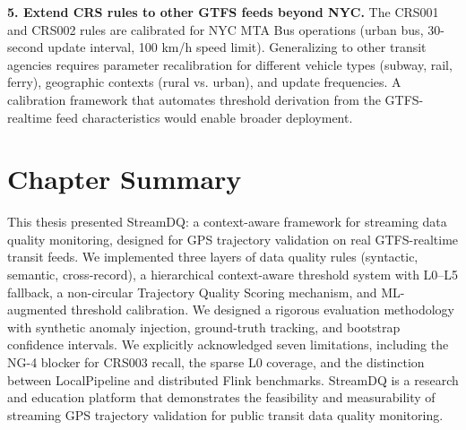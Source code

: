 \textbf{5. Extend CRS rules to other GTFS feeds beyond NYC.} The
CRS001 and CRS002 rules are calibrated for NYC MTA Bus operations (urban
bus, 30-second update interval, 100 km/h speed limit). Generalizing to
other transit agencies requires parameter recalibration for different
vehicle types (subway, rail, ferry), geographic contexts (rural vs. urban),
and update frequencies. A calibration framework that automates threshold
derivation from the GTFS-realtime feed characteristics would enable
broader deployment.

\section*{Chapter Summary}
\label{sec:conclusion-summary}

This thesis presented StreamDQ: a context-aware framework for streaming
data quality monitoring, designed for GPS trajectory validation on real
GTFS-realtime transit feeds. We implemented three layers of data quality
rules (syntactic, semantic, cross-record), a hierarchical context-aware
threshold system with L0--L5 fallback, a non-circular Trajectory Quality
Scoring mechanism, and ML-augmented threshold calibration. We designed a
rigorous evaluation methodology with synthetic anomaly injection, ground-truth
tracking, and bootstrap confidence intervals. We explicitly acknowledged
seven limitations, including the NG-4 blocker for CRS003 recall, the sparse
L0 coverage, and the distinction between LocalPipeline and distributed Flink
benchmarks. StreamDQ is a research and education platform that demonstrates
the feasibility and measurability of streaming GPS trajectory validation
for public transit data quality monitoring.
